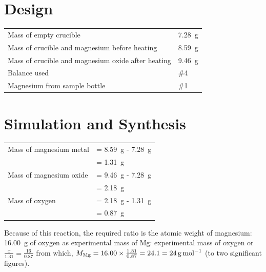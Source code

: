 \documentclass{article}
\begin{document}

\section{Design}

\begin{tabular}{ll}
Mass of empty crucible & \SI{7.28}{\gram}\\
Mass of crucible and magnesium before heating & \SI{8.59}{\gram}\\
Mass of crucible and magnesium oxide after heating & \SI{9.46}{\gram}\\
Balance used & \#4\\
Magnesium from sample bottle & \#1
\end{tabular}


\section{Simulation and Synthesis}

\begin{tabular}{ll}
Mass of magnesium metal & = \SI{8.59}{\gram} - \SI{7.28}{\gram}\\
& = \SI{1.31}{\gram}\\
Mass of magnesium oxide & = \SI{9.46}{\gram} - \SI{7.28}{\gram}\\
& = \SI{2.18}{\gram}\\
Mass of oxygen & = \SI{2.18}{\gram} - \SI{1.31}{\gram}\\
& = \SI{0.87}{\gram}
\end{tabular}

Because of this reaction, the required ratio is the atomic weight of magnesium: \SI{16.00}{\gram} of oxygen as experimental mass of Mg: experimental mass of oxygen or $\frac{x}{1.31}=\frac{16}{0.87}$ from which, $M_{\ce{Mg}} = 16.00 \times \frac{1.31}{0.87} = 24.1 = \SI{24}{\gram\per\mole}$ (to two significant figures).

\end{document}
